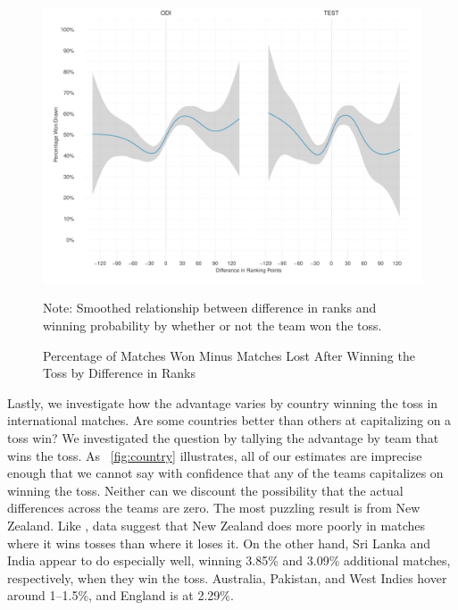 \documentclass[12pt]{article}
\begin{document}
\begin{figure}[htbp]
\centering
\caption{Percentage of Matches Won Minus Matches Lost After Winning the Toss by Difference in Ranks}
\includegraphics[width=1\textwidth]{../figs/winbyRank.pdf}
{\footnotesize Note: Smoothed relationship between difference in ranks and winning probability by whether or not the team won the toss.\par}
\label{fig:ranks}
\end{figure}

Lastly, we investigate how the advantage varies by country winning the toss in international matches. Are some countries better than others at capitalizing on a toss win? We investigated the question by tallying the advantage by team that wins the toss. As ~\ref{fig:country} illustrates, all of our estimates are imprecise enough that we cannot say with confidence that any of the teams capitalizes on winning the toss. Neither can we discount the possibility that the actual differences across the teams are zero. The most puzzling result is from New Zealand. Like \citet{Saad2015}, data suggest that New Zealand does more poorly in matches where it wins tosses than where it loses it. On the other hand, Sri Lanka and India appear to do especially well, winning 3.85\% and 3.09\% additional matches, respectively, when they win the toss. Australia, Pakistan, and West Indies hover around 1--1.5\%, and England is at 2.29\%. 
\end{document}
